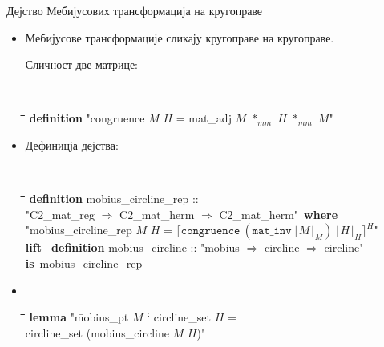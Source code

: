 \documentclass[slidestop, compress, mathserif, containsverbatim, xcolor=dvipsnames]{beamer}
\newcommand{\Reprm}[1]{\ensuremath{\lfloor#1\rfloor_{M}}}
\newcommand{\Repcm}[1]{\ensuremath{\lfloor#1\rfloor_{H}}}
\newcommand{\Abscm}[1]{\ensuremath{\lceil#1\rceil^{H}}}
\begin{document}
\begin{frame}{Дејство Мебијусових трансформација на кругоправе}
  \begin{itemize}
  \item
    \begin{block}{}
      Мебијусове трансформације сликају кругоправе на кругоправе.
    \end{block}
    
    Сличност две матрице:    
    \begin{footnotesize} {\tt
        \begin{tabbing}
          \hspace{1mm}\=\hspace{5mm}\=\hspace{5mm}\=\hspace{5mm}\=\hspace{5mm}\=\kill
                 {\bf definition} "{}congruence $M$ $H$ = mat\_adj $M$ $*_{mm}$ $H$ $*_{mm}$ $M$"\\
        \end{tabbing}
    } \end{footnotesize}

   \item Дефиницја дејства:
    \begin{footnotesize} {\tt
        \begin{tabbing}
          \hspace{1mm}\=\hspace{5mm}\=\hspace{5mm}\=\hspace{5mm}\=\hspace{5mm}\=\kill
                 {\bf definition} mobius\_circline\_rep ::\\
                 \>"{}C2\_mat\_reg $\Rightarrow$ C2\_mat\_herm $\Rightarrow$ C2\_mat\_herm"\ {\bf where}\\
                 \>"{}mobius\_circline\_rep $M$ $H$ = $\Abscm{\mathtt{congruence}\ (\mathtt{mat\_inv}\ \Reprm{M})\ \Repcm{H}}$"\\
                   {\bf lift\_definition} mobius\_circline :: "{}mobius $\Rightarrow$ circline $\Rightarrow$ circline"\\
                   \> {\bf is}\ mobius\_circline\_rep
        \end{tabbing}
    } \end{footnotesize}
  \item \begin{footnotesize} {\tt
      \begin{tabbing}
        \hspace{5mm}\=\hspace{5mm}\=\hspace{5mm}\=\hspace{5mm}\=\hspace{5mm}\=\kill
        {\bf lemma} "{}\=mobius\_pt $M$ ` circline\_set $H$ = \\
                       \>circline\_set (mobius\_circline $M$ $H$)"
      \end{tabbing}
  } \end{footnotesize}
  
  \end{itemize}
\end{frame}
\end{document}
